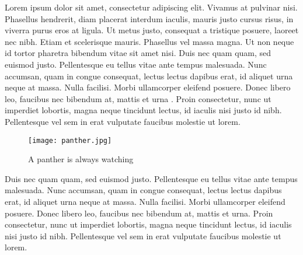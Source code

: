 


Lorem ipsum dolor sit amet, consectetur adipiscing elit. Vivamus at pulvinar nisi. Phasellus hendrerit, diam placerat interdum iaculis, mauris justo cursus risus, in viverra purus eros at ligula. Ut metus justo, consequat a tristique posuere, laoreet nec nibh. Etiam et scelerisque mauris. Phasellus vel massa magna. Ut non neque id tortor pharetra bibendum vitae sit amet nisi. Duis nec quam quam, sed euismod justo. Pellentesque eu tellus vitae ante tempus malesuada. Nunc accumsan, quam in congue consequat, lectus lectus dapibus erat, id aliquet urna neque at massa. Nulla facilisi. Morbi ullamcorper eleifend posuere. Donec libero leo, faucibus nec bibendum at, mattis et urna \cite{AWriter}. Proin consectetur, nunc ut imperdiet lobortis, magna neque tincidunt lectus, id iaculis nisi justo id nibh. Pellentesque vel sem in erat vulputate faucibus molestie ut lorem.

\begin{figure}
    \centering
    \texttt{[image: panther.jpg]}
    \caption[The panther]{A panther is always watching}
    \label{fig: jordan}
\end{figure}

Duis nec quam quam, sed euismod justo. Pellentesque eu tellus vitae ante tempus malesuada. Nunc accumsan, quam in congue consequat, lectus lectus dapibus erat, id aliquet urna neque at massa. Nulla facilisi. Morbi ullamcorper eleifend posuere. Donec libero leo, faucibus nec bibendum at, mattis et urna. Proin consectetur, nunc ut imperdiet lobortis, magna neque tincidunt lectus, id iaculis nisi justo id nibh. Pellentesque vel sem in erat vulputate faucibus molestie ut lorem.


